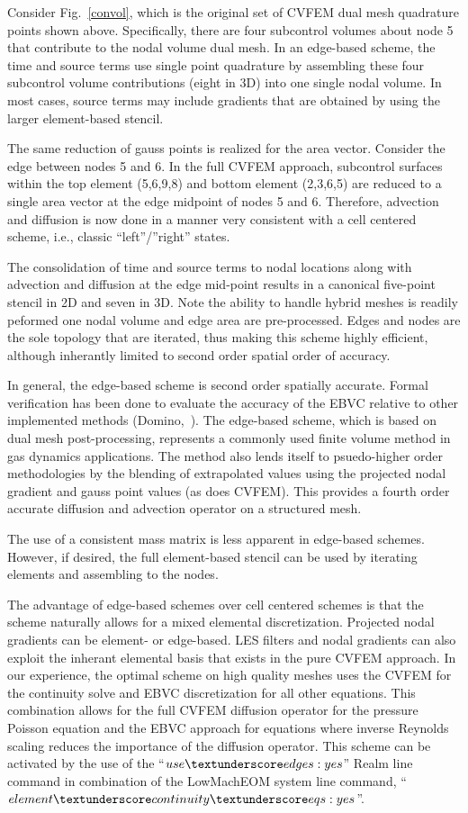 Consider Fig.~\ref{convol}, which is the original set of CVFEM
dual mesh quadrature points shown above. Specifically, there are four subcontrol
volumes about node 5 that contribute to the nodal volume dual mesh.
In an edge-based scheme, the time and source terms use single point
quadrature by assembling these four subcontrol volume contributions
(eight in 3D) into one single nodal volume. In most cases, source terms
may include gradients that are obtained by using the larger element-based
stencil.

The same reduction of gauss points is realized for the area vector.
Consider the edge between nodes 5 and 6. In the full CVFEM approach,
subcontrol surfaces within the top element (5,6,9,8) and bottom
element (2,3,6,5) are reduced to a single area vector at the 
edge midpoint of nodes 5 and 6. Therefore, advection and diffusion
is now done in a manner very consistent with a cell centered scheme, i.e.,
classic ``left''/''right'' states.

The consolidation of time and source terms to nodal locations along with
advection and diffusion at the edge mid-point results in a canonical
five-point stencil in 2D and seven in 3D. Note the ability to handle
hybrid meshes is readily peformed one nodal volume and edge area are
pre-processed. Edges and nodes are the sole topology that are iterated,
thus making this scheme highly efficient, although inherantly limited to 
second order spatial order of accuracy.

In general, the edge-based scheme is second order spatially accurate.
Formal verification has been done to evaluate the accuracy of the EBVC
relative to other implemented methods (Domino,~\cite{Domino:2014}). The edge-based scheme,
which is based on dual mesh post-processing, represents a commonly used finite volume 
method in gas dynamics applications. The method also lends itself to psuedo-higher order 
methodologies by the blending of extrapolated values using the projected nodal 
gradient and gauss point values (as does CVFEM). This provides a fourth order
accurate diffusion and advection operator on a structured mesh.

The use of a consistent mass matrix is less apparent in edge-based
schemes. However, if desired, the full element-based stencil can
be used by iterating elements and assembling to the nodes. 

The advantage of edge-based schemes over cell centered schemes is
that the scheme naturally allows for a mixed elemental discretization. Projected nodal gradients
can be element- or edge-based.  LES
filters and nodal gradients can also exploit the inherant elemental
basis that exists in the pure CVFEM approach. In our experience, the optimal scheme on high quality
meshes uses the CVFEM for the continuity solve and EBVC discretization for all other equations.
This combination allows for the full CVFEM diffusion operator for the pressure Poisson equation
and the EBVC approach for equations where inverse Reynolds scaling reduces the importance of the 
diffusion operator. This scheme can be activated by the use of the ``$use \textunderscore edges: yes$''
Realm line command in combination of the LowMachEOM system line command, 
``$element \textunderscore continuity \textunderscore eqs : yes$''.

